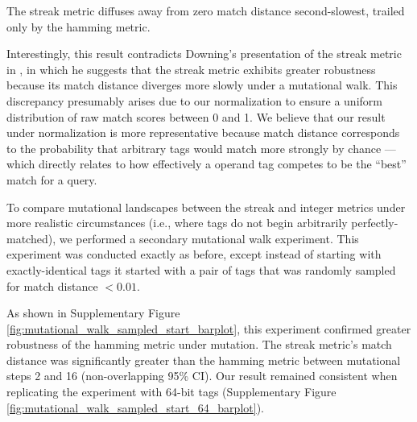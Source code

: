 The streak metric diffuses away from zero match distance second-slowest, trailed only by the hamming metric.

Interestingly, this result contradicts Downing's presentation of the streak metric in \citep{downing2015intelligence}, in which he suggests that the streak metric exhibits greater robustness because its match distance diverges more slowly under a mutational walk.
This discrepancy presumably arises due to our normalization to ensure a uniform distribution of raw match scores between 0 and 1.
We believe that our result under normalization is more representative because match distance corresponds to the probability that arbitrary tags would match more strongly by chance --- which directly relates to how effectively a operand tag competes to be the ``best'' match for a query.

To compare mutational landscapes between the streak and integer metrics under more realistic circumstances (i.e., where tags do not begin arbitrarily perfectly-matched), we performed a secondary mutational walk experiment.
This experiment was conducted exactly as before, except instead of starting with exactly-identical tags it started with a pair of tags that was randomly sampled for match distance $<0.01$.

As shown in Supplementary Figure \ref{fig:mutational_walk_sampled_start_barplot}, this experiment confirmed greater robustness of the hamming metric under mutation.
The streak metric's match distance was significantly greater than the hamming metric between mutational steps 2 and 16 (non-overlapping 95\% CI).
Our result remained consistent when replicating the experiment with 64-bit tags (Supplementary Figure \ref{fig:mutational_walk_sampled_start_64_barplot}).


